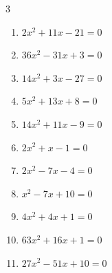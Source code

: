 


\setcounter{quesnum}{30}

\begin{multicols}{3}
\begin{enumerate}
  \itemsep=30pt
  \item $2x^{2}+11x-21=0$


  \item $36x^{2}-31x+3=0$


  \item $14x^{2}+3x-27=0$


  \item $5x^{2}+13x+8=0$


  \item $14x^{2}+11x-9=0$


  \item $2x^{2}+x-1=0$


  \item $2x^{2}-7x-4=0$


  \item $x^{2}-7x+10=0$

        \phantom{$\displaystyle x=5,\; 2$}

  \item $4x^{2}+4x+1=0$


  \item $63x^{2}+16x+1=0$


\columnbreak %

  \item $27x^{2}-51x+10=0$



\end{enumerate}
\end{multicols}
